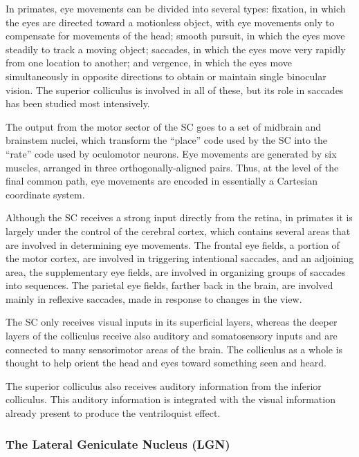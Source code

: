 In primates, eye movements can be divided into several types: fixation,
in which the eyes are directed toward a motionless object, with eye
movements only to compensate for movements of the head; smooth pursuit,
in which the eyes move steadily to track a moving object; saccades, in
which the eyes move very rapidly from one location to another; and
vergence, in which the eyes move simultaneously in opposite directions
to obtain or maintain single binocular vision. The superior colliculus
is involved in all of these, but its role in saccades has been studied
most intensively.

The output from the motor sector of the SC goes to a set of midbrain and
brainstem nuclei, which transform the ``place'' code used by the SC into
the ``rate'' code used by oculomotor neurons. Eye movements are
generated by six muscles, arranged in three orthogonally-aligned pairs.
Thus, at the level of the final common path, eye movements are encoded
in essentially a Cartesian coordinate system.

Although the SC receives a strong input directly from the retina, in
primates it is largely under the control of the cerebral cortex, which
contains several areas that are involved in determining eye movements.
The frontal eye fields, a portion of the motor cortex, are involved in
triggering intentional saccades, and an adjoining area, the
supplementary eye fields, are involved in organizing groups of saccades
into sequences. The parietal eye fields, farther back in the brain, are
involved mainly in reflexive saccades, made in response to changes in
the view.

The SC only receives visual inputs in its superficial layers, whereas
the deeper layers of the colliculus receive also auditory and
somatosensory inputs and are connected to many sensorimotor areas of the
brain. The colliculus as a whole is thought to help orient the head and
eyes toward something seen and heard.

The superior colliculus also receives auditory information from the
inferior colliculus. This auditory information is integrated with the
visual information already present to produce the ventriloquist effect.

\hypertarget{the-lateral-geniculate-nucleus-lgn}{%
\subsubsection{The Lateral Geniculate Nucleus
(LGN)}\label{the-lateral-geniculate-nucleus-lgn}}

